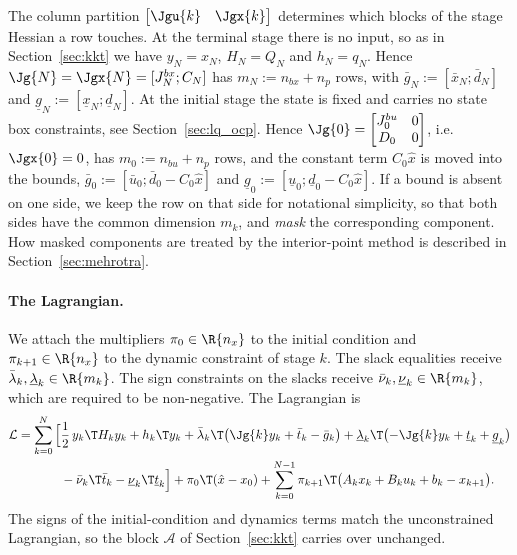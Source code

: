 The column partition $\begin{bmatrix} \Jgu{k} & \Jgx{k} \end{bmatrix}$ determines which blocks of the stage Hessian a row touches.
At the terminal stage there is no input, so as in Section~\ref{sec:kkt} we have $y_N = x_N$, $H_N = Q_N$ and $h_N = q_N$.
Hence $\Jg{N} = \Jgx{N} = [J_N^{bx}; C_N]$ has $m_N := n_{bx} + n_p$ rows, with $\bar{g}_N := [\bar{x}_N; \bar{d}_N]$ and $\underline{g}_N := [\underline{x}_N; \underline{d}_N]$.
At the initial stage the state is fixed and carries no state box constraints, see Section~\ref{sec:lq_ocp}.
Hence $\Jg{0} = \begin{bmatrix} J_0^{bu} & 0 \\ D_0 & 0 \end{bmatrix}$, i.e.\ $\Jgx{0} = 0$, has $m_0 := n_{bu} + n_p$ rows, and the constant term $C_0\hat{x}$ is moved into the bounds, $\bar{g}_0 := [\bar{u}_0; \bar{d}_0 - C_0\hat{x}]$ and $\underline{g}_0 := [\underline{u}_0; \underline{d}_0 - C_0\hat{x}]$.
If a bound is absent on one side, we keep the row on that side for notational simplicity, so that both sides have the common dimension $m_k$, and \textit{mask} the corresponding component.
How masked components are treated by the interior-point method is described in Section~\ref{sec:mehrotra}.

\paragraph{The Lagrangian.}
We attach the multipliers $\pi_0 \in \R{n_x}$ to the initial condition and $\pi_{k+1} \in \R{n_x}$ to the dynamic constraint of stage $k$.
The slack equalities receive $\bar{\lambda}_k, \underline{\lambda}_k \in \R{m_k}$.
The sign constraints on the slacks receive $\bar{\nu}_k, \underline{\nu}_k \in \R{m_k}$, which are required to be non-negative.
The Lagrangian is
\begin{equation} \label{eq:lagrangian}
\begin{aligned}
    \mathcal{L} = \sum_{k=0}^{N} \Big[
        & \frac{1}{2}\, y_k\T H_k y_k + h_k\T y_k
          + \bar{\lambda}_k\T\big(\Jg{k} y_k + \bar{t}_k - \bar{g}_k\big)
          + \underline{\lambda}_k\T\bigl(-\Jg{k} y_k + \underline{t}_k + \underline{g}_k\bigr) \\
        & - \bar{\nu}_k\T \bar{t}_k - \underline{\nu}_k\T \underline{t}_k \Big]
      + \pi_0\T(\hat{x}-x_0)
      + \sum_{k=0}^{N-1} \pi_{k+1}\T\big(A_k x_k + B_k u_k + b_k - x_{k+1}\big) .
\end{aligned}
\end{equation}
The signs of the initial-condition and dynamics terms match the unconstrained Lagrangian, so the block $\mathcal{A}$ of Section~\ref{sec:kkt} carries over unchanged.

